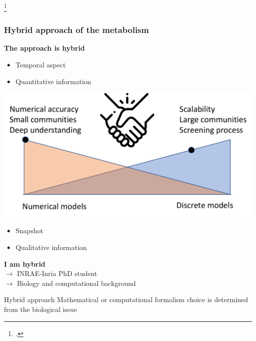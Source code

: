 \documentclass[8pt,usenames,dvipsnames]{beamer}
\begin{document}
\begin{frame}
\begin{minipage}{0.44\textwidth}
\end{minipage}

\tiny \footcite{Nava2023}
\end{frame}

\begin{frame}
\frametitle{Hybrid approach of the metabolism}
\textbf{The approach is hybrid}
\begin{minipage}{0.2\textwidth}
\begin{itemize}
\item Temporal aspect
\item Quantitative information
\end{itemize}
\end{minipage}%
\begin{minipage}{0.6\textwidth}
\includegraphics[width=\textwidth]{figures/further-discrete.pdf}
\end{minipage}%
\begin{minipage}{0.2\textwidth}
\begin{itemize}
\item Snapshot 
\item Qualitative information 
\end{itemize}
\end{minipage}%

\textbf{I am hybrid}\\
$\rightarrow$ INRAE-Inria PhD student\\
$\rightarrow$ Biology and computational background

\begin{alertblock}{Hybrid approach}
\centering
Mathematical or computational formalism choice is determined from the biological issue
\end{alertblock}
\end{frame}
\end{document}
